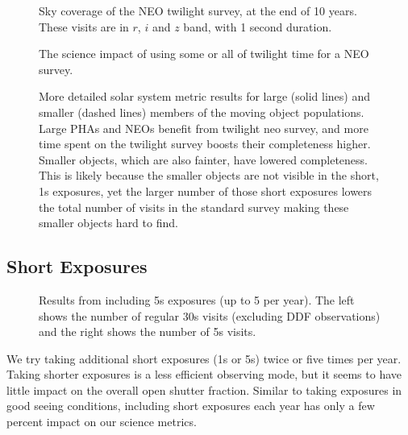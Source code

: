 \begin{figure}
\caption{Sky coverage of the NEO twilight survey, at the end of 10 years. These visits are in $r$, $i$ and $z$ band, with 1 second duration.}
\label{fig:sky_twilightneo}
\end{figure}

\begin{figure}
\caption{The science impact of using some or all of twilight time for a NEO survey.}\label{fig:neoradar}
\end{figure}

\begin{figure}
\caption{More detailed solar system metric results for large (solid lines) and smaller (dashed lines) members of the moving object populations. Large PHAs and NEOs benefit from twilight neo survey, and more time spent on the twilight survey boosts their completeness higher. Smaller objects, which are also fainter, have lowered completeness. This is likely because the smaller objects are not visible in the short, 1s exposures, yet the larger number of those short exposures lowers the total number of visits in the standard survey making these smaller objects hard to find.}
\label{fig:sscompleteness_twilight}
\end{figure}

\subsection{Short Exposures}

\begin{figure}
\caption{Results from including 5s exposures (up to 5 per year). The left shows the number of regular 30s visits (excluding DDF observations) and the right shows the number of 5s visits.}
\end{figure}

We try taking additional short exposures (1s or 5s) twice or five times per year. Taking shorter exposures is a less efficient observing mode, but it seems to have little impact on the overall open shutter fraction. Similar to taking exposures in good seeing conditions, including short exposures each year has only a few percent impact on our science metrics.

